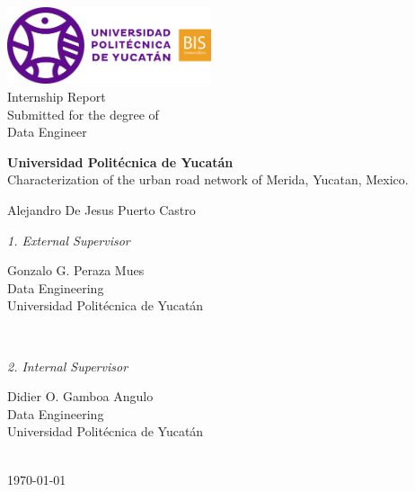 \begin{titlepage}

	\centering

	\includegraphics[width=6cm]{Figures/logo} \\[2mm]
	\textsf{Internship Report} \\
	\textsf{Submitted for the degree of} \\
	\textsf{Data Engineer} \\

	\vfill

	{\LARGE \textbf{Universidad Politécnica de Yucatán} \\
	\LARGE  Characterization of the urban road network of Merida, Yucatan, Mexico.  \\[10mm]}

	{\Large Alejandro De Jesus Puerto Castro} \\

	\vfill
	\begin{minipage}[t]{.27\textwidth}
		\raggedleft
		\textit{1. External Supervisor}
	\end{minipage}
	\hspace*{15pt}
	\begin{minipage}[t]{.65\textwidth}
		{\Large Gonzalo G. Peraza Mues} \\
	  	{\small Data Engineering} \\[-1mm]
		{\small Universidad Politécnica de Yucatán}
	\end{minipage} \\[5mm]
	\begin{minipage}[t]{.27\textwidth}
		\raggedleft
		\textit{2. Internal Supervisor}
	\end{minipage}
	\hspace*{15pt}
	\begin{minipage}[t]{.65\textwidth}
		{\Large Didier O. Gamboa Angulo} \\
	  	{\small Data Engineering} \\[-1mm]
		{\small Universidad Politécnica de Yucatán}
	\end{minipage} \\[10mm]

	\today \\

\end{titlepage}
